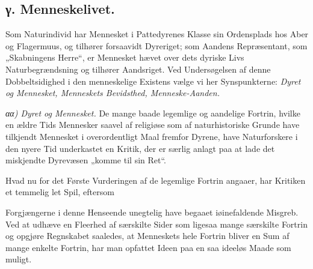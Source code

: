 \documentclass[12pt,a4paper]{book}
\begin{document}
\subsection*{γ. Menneskelivet.}

Som Naturindivid har Mennesket i Pattedyrenes Klasse sin Ordensplads hos Aber og
Flagermuus, og tilhører forsaavidt Dyreriget; som Aandens Repræsentant, som
„Skabningens Herre“, er Mennesket hævet over dets dyriske Livs Naturbegrændsning
og tilhører Aandsriget. Ved Undersøgelsen af denne Dobbeltsidighed i den
menneskelige Existens vælge vi her Synspunkterne: \emph{Dyret og Mennesket,
Menneskets Bevidsthed, Menneske-Aanden.}

\emph{αα) Dyret og Mennesket.} De mange baade legemlige og aandelige Fortrin,
hvilke en ældre Tids Mennesker saavel af religiøse som af naturhistoriske Grunde
have tilkjendt Mennesket i overordentligt Maal fremfor Dyrene, have Naturforskere
i den nyere Tid underkastet en Kritik, der er særlig anlagt paa at lade det
miskjendte Dyrevæsen „komme til sin Ret“.

Hvad nu for det Første Vurderingen af de legemlige Fortrin angaaer, har Kritiken
et temmelig let Spil, eftersom

\setcounter{footnote}{0}
Forgjængerne i denne Henseende unegtelig have begaaet iøinefaldende Misgreb. Ved
at udhæve en Fleerhed af særskilte Sider som ligesaa mange særskilte Fortrin og
opgjøre Regnskabet saaledes, at Menneskets hele Fortrin bliver en Sum af mange
enkelte Fortrin, har man opfattet Ideen paa en saa ideeløs Maade som muligt.
\end{document}
